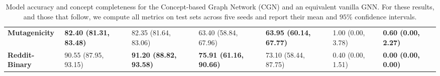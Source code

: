 \begin{table*}[!t]
{\begin{tabular}{lllllll}
\textbf{Mutagenicity}  & \textbf{82.40 (81.31, 83.48)}         & 82.35 (81.64, 83.06)                          & 63.40 (58.84, 67.96)            & \textbf{63.95 (60.14, 67.77)}                    & 1.00 (0.00, 3.78)                     & \textbf{0.60 (0.00, 2.27)}                    \\
\textbf{Reddit-Binary} & 90.55 (87.95, 93.15)                  & \textbf{91.20 (88.82, 93.58)}                 & \textbf{75.91 (61.16, 90.66)}             & 73.10 (58.44, 87.75)                  & 0.40 (0.00, 1.51)                     & \textbf{0.00 (0.00, 0.00)}                   \\ \bottomrule
\end{tabular}%
}
\caption{Model accuracy and concept completeness for the Concept-based Graph Network (CGN) and an equivalent vanilla GNN. For these results, and those that follow, we compute all metrics on test sets across five seeds and report their mean and $95\%$ confidence intervals.}
    \label{fig:accuracy}
\end{table*}



